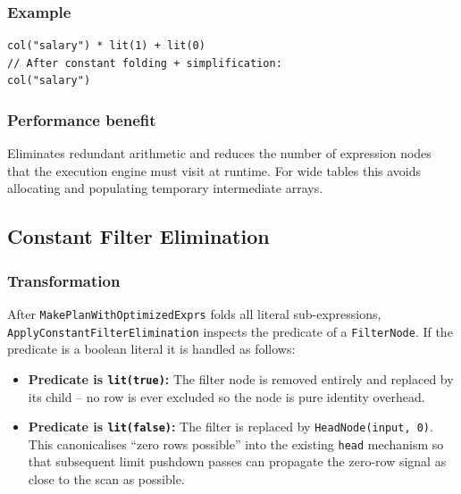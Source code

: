 \documentclass[12pt,a4paper]{article}
\begin{document}
\subsubsection*{Example}

\begin{lstlisting}
col("salary") * lit(1) + lit(0)
// After constant folding + simplification:
col("salary")
\end{lstlisting}

\subsubsection*{Performance benefit}

Eliminates redundant arithmetic and reduces the number of expression nodes
that the execution engine must visit at runtime.  For wide tables this
avoids allocating and populating temporary intermediate arrays.

\subsection{Constant Filter Elimination}

\subsubsection*{Transformation}

After \texttt{MakePlanWithOptimizedExprs} folds all literal sub-expressions,
\texttt{ApplyConstantFilterElimination} inspects the predicate of a
\texttt{FilterNode}.  If the predicate is a boolean literal it is handled as
follows:

\begin{itemize}[leftmargin=1.5em]
  \item \textbf{Predicate is \texttt{lit(true)}:} The filter node is removed
        entirely and replaced by its child -- no row is ever excluded so the
        node is pure identity overhead.
  \item \textbf{Predicate is \texttt{lit(false)}:} The filter is replaced by
        \texttt{HeadNode(input, 0)}.  This canonicalises ``zero rows
        possible'' into the existing \texttt{head} mechanism so that
        subsequent limit pushdown passes can propagate the zero-row signal
        as close to the scan as possible.
\end{itemize}
\end{document}
